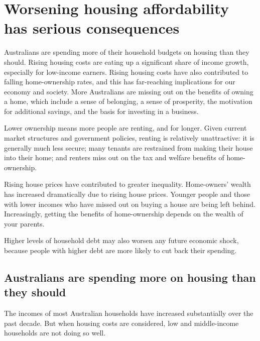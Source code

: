 \chapter{Worsening housing affordability has serious consequences }\label{chap:worsening-housing-affordability-has-serious-consequences}

Australians are spending more of their household budgets on housing than they should. Rising housing costs are eating up a significant share of income growth, especially for low-income earners. Rising housing costs have also contributed to falling home-ownership rates, and this has far-reaching implications for our economy and society. More Australians are missing out on the benefits of owning a home, which include a sense of belonging, a sense of prosperity, the motivation for additional savings, and the basis for investing in a business.

Lower ownership means more people are renting, and for longer.
Given current market structures and government policies, renting is relatively unattractive: it is generally much less secure; many tenants are restrained from making their house into their home; and renters miss out on the tax and welfare benefits of home-ownership.

Rising house prices have contributed to greater inequality.
Home-owners' wealth has increased dramatically due to rising house prices. Younger people and those with lower incomes who have missed out on buying a house are being left behind.
Increasingly, getting the benefits of home-ownership depends on the wealth of your parents.

Higher levels of household debt may also worsen any future economic shock, because people with higher debt are more likely to cut back their spending.

\section{Australians are spending more on housing than they should}\label{sec:Australians-spending-more-on-housing-than-need-to}

The incomes of most Australian households have increased substantially over the past decade.
But when housing costs are considered, low and middle-income households are not doing so well.


